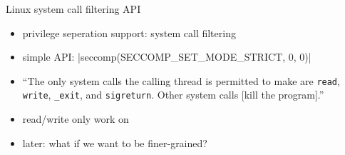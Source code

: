 \begin{frame}{Linux system call filtering API}
    \begin{itemize}
    \item privilege seperation support: system call filtering
    \item simple API: \Cinline|seccomp(SECCOMP_SET_MODE_STRICT, 0, 0)|
        \vspace{.5cm}
            \item ``The only system calls the calling thread is permitted to make are \texttt{read},
                \texttt{write}, \texttt{\_exit}, and \texttt{sigreturn}. Other system calls [kill
                the program].''
            \item read/write only work on 
    \vspace{.5cm}
    \item later: what if we want to be finer-grained?
    \end{itemize}
\end{frame}
